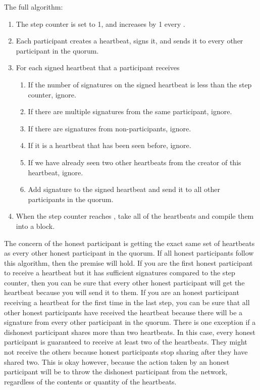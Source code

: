 \documentclass[twocolumn]{article}
\begin{document}
The full algorithm:
\begin{enumerate}
	\item The step counter is set to 1, and increases by 1 every \stepduration{}.
	\item Each participant creates a heartbeat, signs it, and sends it to every other participant in the quorum.
	\item For each signed heartbeat that a participant receives
	\begin{enumerate}
		\item If the number of signatures on the signed heartbeat is less than the step counter, ignore.
		\item If there are multiple signatures from the same participant, ignore.
		\item If there are signatures from non-participants, ignore.
		\item If it is a heartbeat that has been seen before, ignore.
		\item If we have already seen two other heartbeats from the creator of this heartbeat, ignore.
		\item Add signature to the signed heartbeat and send it to all other participants in the quorum.
	\end{enumerate}
	\item When the step counter reaches \quorumsize{}, take all of the heartbeats and compile them into a block.
\end{enumerate}

The concern of the honest participant is getting the exact same set of heartbeats as every other honest participant in the quorum.
If all honest participants follow this algorithm, then the premise will hold.
If you are the first honest participant to receive a heartbeat but it has sufficient signatures compared to the step counter, then you can be sure that every other honest participant will get the heartbeat because you will send it to them.
If you are an honest participant receiving a heartbeat for the first time in the last step, you can be sure that all other honest participants have received the heartbeat because there will be a signature from every other participant in the quorum.
There is one exception if a dishonest participant shares more than two heartbeats.
In this case, every honest participant is guaranteed to receive at least two of the heartbeats.
They might not receive the others because honest participants stop sharing after they have shared two.
This is okay however, because the action taken by an honest participant will be to throw the dishonest participant from the network, regardless of the contents or quantity of the heartbeats.
\end{document}
